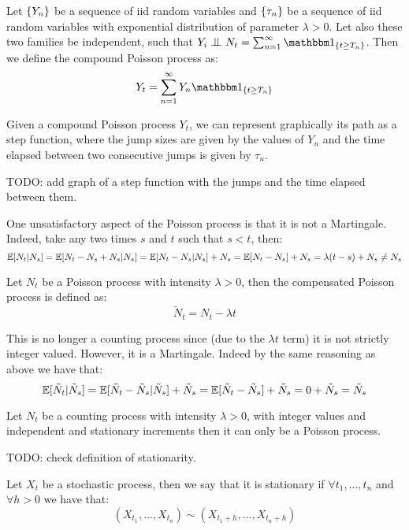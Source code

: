 \begin{definition}
    Let $\{ Y_n \}$ be a sequence of iid random variables and $\{ \tau_n \}$ be a
    sequence of iid random variables with exponential distribution of parameter
    $\lambda > 0$. Let also these two families be independent, such that
    $Y_i \indep N_t = \sum^\infty_{n=1} \I_{\{t\geq T_n\}}$. Then we define the
    compound Poisson process as:
    \[
        Y_t = \sum^\infty_{n=1} Y_n \I_{\{t\geq T_n\}}
    \]
\end{definition}

Given a compound Poisson process $Y_t$, we can represent graphically its path
as a step function, where the jump sizes are given by the values of $Y_n$ and
the time elapsed between two consecutive jumps is given by $\tau_n$.

TODO: add graph of a step function with the jumps and the time elapsed between
them.

One unsatisfactory aspect of the Poisson process is that it is not
a Martingale. Indeed, take any two times $s$ and $t$ such that $s<t$, then:
\[
    \mathbb{E}[N_t | N_s] = \mathbb{E}[N_t - N_s + N_s | N_s] = \mathbb{E}[N_t - N_s | N_s] + N_s
    = \mathbb{E}[N_t - N_s] + N_s = \lambda(t-s) + N_s \neq N_s
\]

\begin{definition}
    Let $N_t$ be a Poisson process with intensity $\lambda > 0$, then the
    compensated Poisson process is defined as:
    \[
        \tilde{N}_t = N_t - \lambda t
    \]
\end{definition}

This is no longer a counting process since (due to the $\lambda t$ term) it is
not strictly integer valued. However, it is a Martingale. Indeed by the same
reasoning as above we have that:
\[
    \mathbb{E}[\tilde{N}_t | \tilde{N}_s] = \mathbb{E}[\tilde{N}_t - \tilde{N}_s | \tilde{N}_s]
    + \tilde{N}_s = \mathbb{E}[\tilde{N}_t - \tilde{N}_s] + \tilde{N}_s = 0 + \tilde{N}_s
    = \tilde{N}_s
\]

\begin{theorem}
    Let $N_t$ be a counting process with intensity $\lambda > 0$, with integer
    values and independent and stationary increments then it can only be a
    Poisson process. 
\end{theorem}

TODO: check definition of stationarity.
\begin{definition}[Stationary]
    Let $X_t$ be a stochastic process, then we say that it is stationary if
    $\forall t_1,\ldots,t_n$ and $\forall h > 0$ we have that:
    \[
        (X_{t_1},\ldots,X_{t_n}) \sim (X_{t_1+h},\ldots,X_{t_n+h})
    \]
\end{definition}

